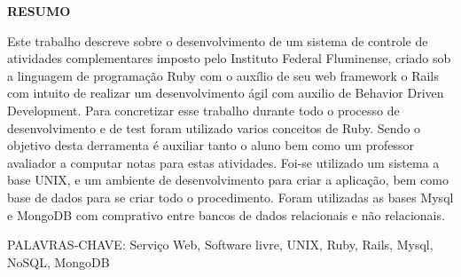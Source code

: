 \begin{center}
\textbf{RESUMO}
\end{center}
\singlespacing

\noindent Este trabalho descreve sobre o desenvolvimento de um sistema de controle de atividades complementares imposto pelo Instituto Federal Fluminense, 
criado sob a linguagem de programação Ruby com o auxílio de seu web framework o Rails com intuito de realizar um desenvolvimento ágil com auxilio de 
Behavior Driven Development. Para concretizar esse trabalho durante todo o processo de desenvolvimento e de test foram utilizado varios conceitos de Ruby. 
Sendo o objetivo desta derramenta é auxiliar tanto o aluno bem como um professor avaliador a computar notas para estas atividades. Foi-se utilizado um sistema 
a base UNIX, e um ambiente de desenvolvimento para criar a aplicação, bem como base de dados para se criar todo o procedimento. 
Foram utilizadas as bases Mysql e MongoDB com comprativo entre bancos de dados relacionais e não relacionais.

\noindent PALAVRAS-CHAVE:  Serviço Web, Software livre, UNIX,  Ruby, Rails, Mysql, NoSQL, MongoDB 
